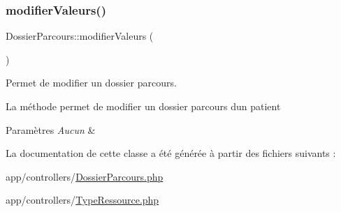 \subsubsection{\texorpdfstring{modifier\+Valeurs()}{modifierValeurs()}}
{\footnotesize\ttfamily Dossier\+Parcours\+::modifier\+Valeurs (\begin{DoxyParamCaption}{ }\end{DoxyParamCaption})}



Permet de modifier un dossier parcours. 

La méthode permet de modifier un dossier parcours d\textquotesingle{}un patient 
\begin{DoxyParams}{Paramètres}
{\em Aucun} & \\
\hline
\end{DoxyParams}


La documentation de cette classe a été générée à partir des fichiers suivants \+:\begin{DoxyCompactItemize}
\item 
app/controllers/\hyperlink{_dossier_parcours_8php}{Dossier\+Parcours.\+php}\item 
app/controllers/\hyperlink{_type_ressource_8php}{Type\+Ressource.\+php}\end{DoxyCompactItemize}
